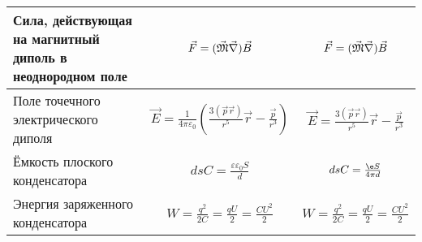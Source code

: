 \begin{longtable}{|L{4cm}|c|c|}
	Сила, действующая на магнитный диполь в неоднородном поле   &$\vec{F}=(\vec{\mathfrak M}\vec{\nabla})\vec{B}$					  &	$\vec{F}=(\vec{\mathfrak M}\vec{\nabla})\vec{B}$													   \\ \hline
	Поле точечного электрического диполя         &	$\vec{E}=\frac{1}{4\pi\varepsilon_0}\left(\frac{3(\vec{p}\vec{r})}{r^5}\vec{r}-\frac{\vec{p}}{r^3}\right)$&	$\vec{E}=\frac{3(\vec{p}\vec{r})}{r^5}\vec{r}-\frac{\vec{p}}{r^3}$	   \\ \hline
	Ёмкость плоского конденсатора				 &		$ds C=\frac{\varepsilon\varepsilon_0S}{d}$								  &			$ds C=\frac{\e S}{4\pi d}$															   \\ \hline
	Энергия заряженного конденсатора			 &		$W=\frac{q^2}{2C}=\frac{qU}{2}=\frac{CU^2}{2}$						  &			$W=\frac{q^2}{2C}=\frac{qU}{2}=\frac{CU^2}{2}$										   \\
	\hline
\end{longtable}